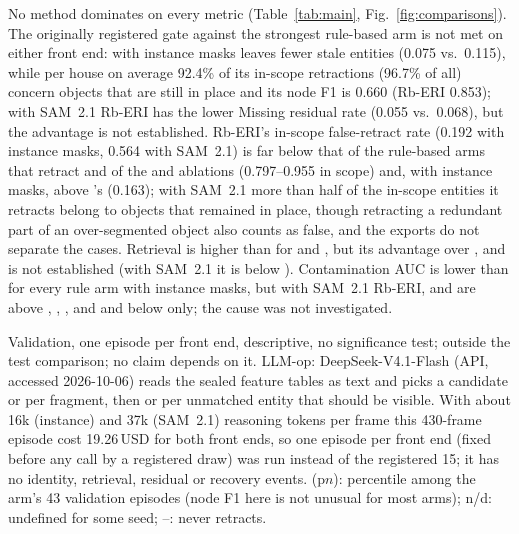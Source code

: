 No method dominates on every metric (Table~\ref{tab:main}, Fig.~\ref{fig:comparisons}).
The originally registered gate against the strongest rule-based arm is not met on either front end: with instance masks  leaves fewer stale entities (0.075 vs.\ 0.115), while per house on average 92.4\% of its in-scope retractions (96.7\% of all) concern objects that are still in place and its node F1 is 0.660 (Rb-ERI 0.853); with SAM~2.1 Rb-ERI has the lower Missing residual rate (0.055 vs.\ 0.068), but the advantage is not established.
Rb-ERI's in-scope false-retract rate (0.192 with instance masks, 0.564 with SAM~2.1) is far below that of the rule-based arms that retract and of the  and  ablations (0.797--0.955 in scope) and, with instance masks, above 's (0.163); with SAM~2.1 more than half of the in-scope entities it retracts belong to objects that remained in place, though retracting a redundant part of an over-segmented object also counts as false, and the exports do not separate the cases.
Retrieval is higher than for  and , but its advantage over ,  and  is not established (with SAM~2.1 it is below ).
Contamination AUC is lower than for every rule arm with instance masks, but with SAM~2.1 Rb-ERI,  and  are above , , ,  and  and below  only; the cause was not investigated.

\begin{table}[t]
\centering
\caption{LLM-op and the Other Arms on One Validation Episode}
\label{tab:llm_op}
\scriptsize
\setlength{\tabcolsep}{3.2pt}
\renewcommand{\arraystretch}{0.94}


\smallskip
\parbox{\columnwidth}{\scriptsize Validation, one episode per front end, descriptive, no significance test; outside the test comparison; no claim depends on it. LLM-op: DeepSeek-V4.1-Flash (API, accessed 2026-10-06) reads the sealed feature tables as text and picks a candidate or  per fragment, then  or  per unmatched entity that should be visible. With about 16k (instance) and 37k (SAM~2.1) reasoning tokens per frame this 430-frame episode cost 19.26\,USD for both front ends, so one episode per front end (fixed before any call by a registered draw) was run instead of the registered 15; it has no identity, retrieval, residual or recovery events. (p$n$): percentile among the arm's 43 validation episodes (node F1 here is not unusual for most arms); n/d: undefined for some seed; --: never retracts.}
\end{table}

